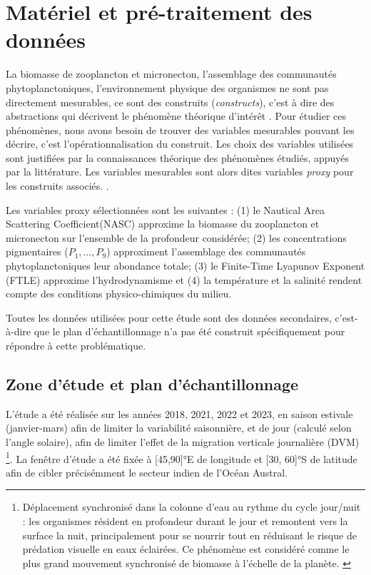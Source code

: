 \chapter{Matériel et pré-traitement des données }%
La biomasse de zooplancton et micronecton, l'assemblage des communautés phytoplanctoniques, l'environnement physique des organismes ne sont pas directement mesurables, ce sont des construits (\textit{constructs}), c'est à dire des abstractions qui décrivent le phénomène théorique d'intérêt \cite{edwards2000nature}. Pour étudier ces phénomènes, nous avons besoin de trouver des variables mesurables pouvant les décrire, c'est l'opérationnalisation du construit. Les choix des variables utilisées sont justifiées par la connaissances théorique des phénomènes étudiés, appuyés par la littérature. Les variables mesurables sont alors dites variables \textit{proxy} pour les construits associés. \cite{shmueli2010explain}.
 
 
 Les variables proxy sélectionnées sont les suivantes : (1) le Nautical Area Scattering Coefficient(NASC) approxime la biomasse du zooplancton et micronecton sur l'ensemble de la profondeur considérée; (2) les concentrations pigmentaires ($P_1, \ldots, P_9$) approximent l'assemblage des communautés phytoplanctoniques leur abondance totale; (3) le Finite-Time Lyapunov Exponent (FTLE) approxime l'hydrodynamisme et (4) la température et la salinité rendent compte des conditions physico-chimiques du milieu.
 
 Toutes les données utilisées pour cette étude sont des données secondaires, c'est-à-dire que le plan d'échantillonnage n'a pas été construit spécifiquement pour répondre à cette problématique.
 
 \section{Zone d'étude et plan d'échantillonnage}
 
 L'étude a été réalisée sur les années 2018, 2021, 2022 et 2023, en saison estivale (janvier-mars) afin de limiter la variabilité saisonnière, et de jour (calculé selon l'angle solaire), afin de limiter l'effet de la migration verticale journalière (DVM) \footnote{Déplacement synchronisé dans la colonne d'eau au rythme du cycle jour/nuit : les organismes résident en profondeur durant le jour et remontent vers la surface la nuit, principalement pour se nourrir tout en réduisant le risque de prédation visuelle en eaux éclairées. Ce phénomène est considéré comme le plus grand mouvement synchronisé de biomasse à l'échelle de la planète. \cite{Bandara2021}}. La fenêtre d'étude a été fixée à [45,90]°E de longitude et [30, 60]°S de latitude afin de cibler précisémment le secteur indien de l'Océan Austral.
 
